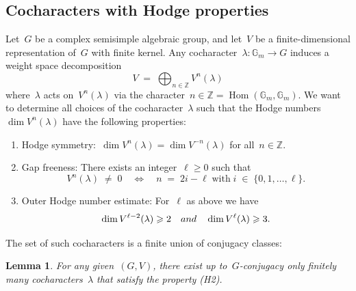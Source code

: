 \documentclass[a4paper]{amsart}
\newcommand{\bbG}{\mathbb{G}}
\newcommand{\bbZ}{\mathbb{Z}}
\DeclareMathOperator{\Hom}{Hom}
\renewcommand{\ge}{\geqslant}
\theoremstyle{plain}
\newtheorem{lemma}[theorem]{Lemma}
\theoremstyle{definition}
\numberwithin{equation}{section}
\begin{document}
\subsection{Cocharacters with Hodge properties}  

Let~$G$ be a complex semisimple algebraic group, and let~$V$ be a finite-dimensional representation of~$G$ with finite kernel. Any cocharacter~$\lambda\colon \bbG_m \rightarrow G$
induces a weight space decomposition
%
\[
 V \;=\; \bigoplus_{n\in \bbZ} V^n(\lambda)
\]
%
where~$\lambda$ acts on~$V^n(\lambda)$ via the character~$n\in \bbZ= \Hom(\bbG_m, \bbG_m)$. We want to determine all choices of the cocharacter~$\lambda$ such that the Hodge numbers~$\dim V^n(\lambda)$ have the following properties:\smallskip

\begin{enumerate}
\item[(H1)] Hodge symmetry:~$\dim V^n(\lambda) = \dim V^{-n}(\lambda)$ for all~$n\in \bbZ$.\smallskip
\item[(H2)] Gap freeness: There exists an integer~$\ell \ge 0$ such that 
%
\[
 V^n(\lambda) \;\neq\; 0 
 \quad \Longleftrightarrow \quad 
 n \;=\; 2i - \ell \; \text{with} \; i\;\in\; \{0,1,\dots, \ell\}.
\]
\item[(H3)] Outer Hodge number estimate: For~$\ell$ as above we have
\[ \dim V^{\ell-2}(\lambda) \ge 2 \quad \textup{and} \quad \dim V^\ell(\lambda) \ge 3.\]
\end{enumerate} 
%
The set of such cocharacters is a finite union of conjugacy classes:

\begin{lemma}
For any given~$(G, V)$, there exist up to~$G$-conjugacy only finitely many cocharacters~$\lambda$ that satisfy the property (H2). 
\end{lemma} 
\end{document}
